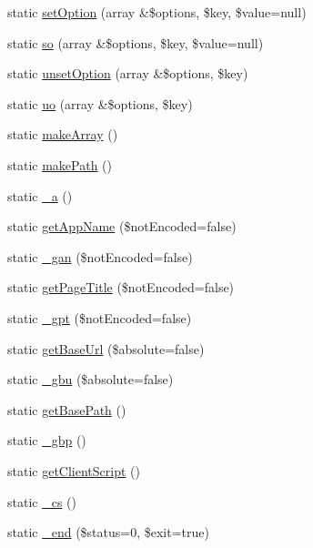 \begin{DoxyCompactItemize}
\item 
static \hyperlink{classYiiXLBase_abace05e5a45c50d1a9e007a18188afb8}{setOption} (array \&\$options, \$key, \$value=null)
\item 
static \hyperlink{classYiiXLBase_a1231e1f518d8366fc4f8668ed19939d1}{so} (array \&\$options, \$key, \$value=null)
\item 
static \hyperlink{classYiiXLBase_a087a87bf580b88bb900700b3c944dfba}{unsetOption} (array \&\$options, \$key)
\item 
static \hyperlink{classYiiXLBase_a62ea6eb4323d1c2f553d2bf12288e6e1}{uo} (array \&\$options, \$key)
\item 
static \hyperlink{classYiiXLBase_afe0c023a25109be01e517d26f99d85db}{makeArray} ()
\item 
static \hyperlink{classYiiXLBase_afe923f7a71bf641851bf3acb637228e0}{makePath} ()
\item 
static \hyperlink{classYiiXLBase_ae09ab8187b8a6c8c52edbf143ab29178}{\_\-a} ()
\item 
static \hyperlink{classYiiXLBase_acccbaa90b1a64a266dccb84beddc0072}{getAppName} (\$notEncoded=false)
\item 
static \hyperlink{classYiiXLBase_a1d56b31ce9c7910652552fbbff54e753}{\_\-gan} (\$notEncoded=false)
\item 
static \hyperlink{classYiiXLBase_ac40cca24aed8a5bee1923c9246dfb524}{getPageTitle} (\$notEncoded=false)
\item 
static \hyperlink{classYiiXLBase_af074b8b3a4af1495117d744265f41ebb}{\_\-gpt} (\$notEncoded=false)
\item 
static \hyperlink{classYiiXLBase_a708f96ed3ee0883697ce4914fdddfba9}{getBaseUrl} (\$absolute=false)
\item 
static \hyperlink{classYiiXLBase_a7c4e9be274589248e2464de14fad190e}{\_\-gbu} (\$absolute=false)
\item 
static \hyperlink{classYiiXLBase_a3bb459a6846521b0bd79787a1087ebf1}{getBasePath} ()
\item 
static \hyperlink{classYiiXLBase_affd02de4bb532b2fb524f94f4e5ea40a}{\_\-gbp} ()
\item 
static \hyperlink{classYiiXLBase_a49d793208ca4ce56f72b743ef86dd162}{getClientScript} ()
\item 
static \hyperlink{classYiiXLBase_af1b9a8d121721a5a4454e0fb067f7cad}{\_\-cs} ()
\item 
static \hyperlink{classYiiXLBase_a24e233f4e0820febba74cd15dd57b6d8}{\_\-end} (\$status=0, \$exit=true)
\item 

\end{DoxyCompactItemize}
